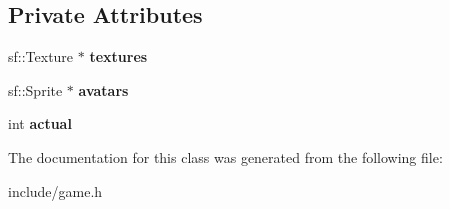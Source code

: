 \subsection*{Private Attributes}
\begin{DoxyCompactItemize}
\item 
sf\+::\+Texture $\ast$ {\bfseries textures}\hypertarget{classAvatar_af92a8199bf29116cbbdb34a0fcbe2273}{}\label{classAvatar_af92a8199bf29116cbbdb34a0fcbe2273}

\item 
sf\+::\+Sprite $\ast$ {\bfseries avatars}\hypertarget{classAvatar_afee56f77454acff190044e08867ee87c}{}\label{classAvatar_afee56f77454acff190044e08867ee87c}

\item 
int {\bfseries actual}\hypertarget{classAvatar_aae21cdaf10a7378c2dc001cea97d832e}{}\label{classAvatar_aae21cdaf10a7378c2dc001cea97d832e}

\end{DoxyCompactItemize}


The documentation for this class was generated from the following file\+:\begin{DoxyCompactItemize}
\item 
include/game.\+h\end{DoxyCompactItemize}

